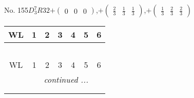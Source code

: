 \documentclass[fleqn,9pt,landscape]{jsarticle}
\begin{document}
\newpage
No. 155\quad$D_{3}^{7}$\quad$R32$\quad[ trigonal ]\quad$+\begin{pmatrix} 0 & 0 & 0 \end{pmatrix}$,\quad $+\begin{pmatrix} \frac{2}{3} & \frac{1}{3} & \frac{1}{3} \end{pmatrix}$,\quad $+\begin{pmatrix} \frac{1}{3} & \frac{2}{3} & \frac{2}{3} \end{pmatrix}$
\begin{center}
\renewcommand{\arraystretch}{1.2}
\begin{longtable}{ccccccc}
 \hline \hline
WL & 1 & 2 & 3 & 4 & 5 & 6 \\ \hline \endfirsthead

\multicolumn{6}{l}{\tablename\ \thetable{}} \\
 \hline \hline
WL & 1 & 2 & 3 & 4 & 5 & 6 \\ \hline \endhead

 \hline \hline
\multicolumn{6}{r}{\footnotesize\it continued ...} \\ \endfoot

 \hline \hline
\multicolumn{6}{r}{} \\ \endlastfoot


\end{longtable}
\end{center}
\end{document}
